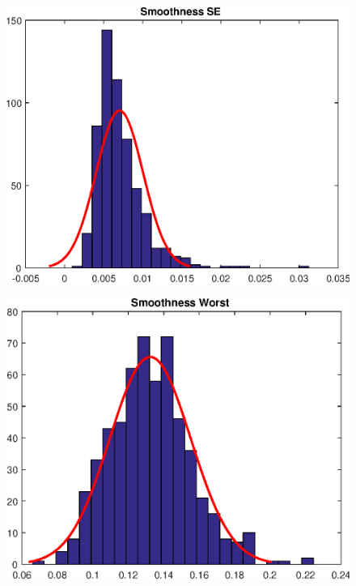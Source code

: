 \documentclass[11pt,a4paper]{article}
\numberwithin{equation}{section}
\begin{document}
\begin{itemize}
\begin{figure}[H]
\centering
\begin{minipage}{.4\textwidth}
  \centering
  \includegraphics[width=\linewidth]{./img/smoothness_se}
  \label{fig:test1}
\end{minipage}%
\begin{minipage}{.4\textwidth}
  \centering
  \includegraphics[width=\linewidth]{./img/smoothness_worst}
  \label{fig:test2}
\end{minipage}
\end{figure}


\end{itemize}
\end{document}

